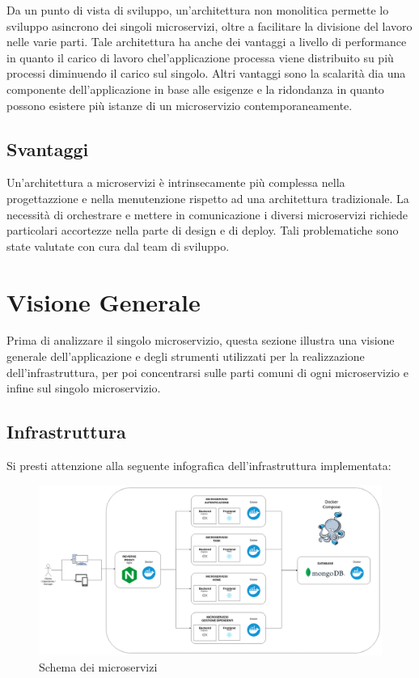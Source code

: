 \documentclass{report}
\begin{document}
Da un punto di vista di sviluppo, un'architettura non monolitica permette lo sviluppo asincrono dei singoli microservizi, oltre a facilitare la divisione del lavoro nelle varie parti. Tale architettura ha anche dei vantaggi a livello di performance in quanto il carico di lavoro chel'applicazione processa viene distribuito su più processi diminuendo il carico sul singolo. Altri vantaggi sono la scalarità dia una componente dell'applicazione in base alle esigenze e la ridondanza in quanto possono esistere più istanze di un microservizio contemporaneamente.

\subsection*{Svantaggi}

Un'architettura a microservizi è intrinsecamente più complessa nella progettazzione e nella menutenzione rispetto ad una architettura tradizionale. La necessità di orchestrare e mettere in comunicazione i diversi microservizi richiede particolari accortezze nella parte di design e di deploy. Tali problematiche sono state valutate con cura dal team di sviluppo.

\section{Visione Generale}
Prima di analizzare il singolo microservizio, questa sezione illustra una visione generale dell'applicazione e degli strumenti utilizzati per la realizzazione dell'infrastruttura, per poi concentrarsi sulle parti comuni di ogni microservizio e infine sul singolo microservizio.


\subsection*{Infrastruttura}

Si presti attenzione alla seguente infografica dell'infrastruttura implementata:

\begin{figure}[H]
	\centering\includegraphics[width=1\textwidth]{images/diagramma_microservizi.png}
	Schema dei microservizi
\end{figure}
\end{document}
